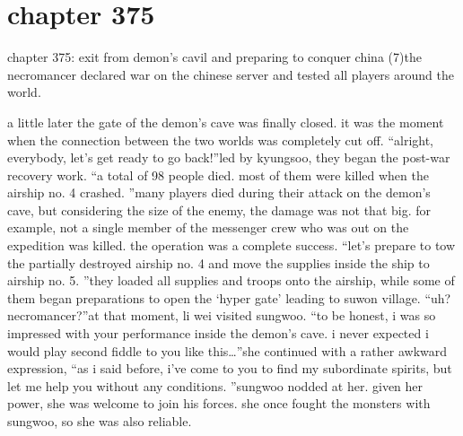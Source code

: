 \section{chapter 375}

chapter 375: exit from demon’s cavil and preparing to conquer china (7)the necromancer declared war on the chinese server and tested all players around the world.





a little later the gate of the demon’s cave was finally closed.
 it was the moment when the connection between the two worlds was completely cut off.
“alright, everybody, let’s get ready to go back!”led by kyungsoo, they began the post-war recovery work.
“a total of 98 people died.
 most of them were killed when the airship no.
 4 crashed.
”many players died during their attack on the demon’s cave, but considering the size of the enemy, the damage was not that big.
 for example, not a single member of the messenger crew who was out on the expedition was killed.
 the operation was a complete success.
“let’s prepare to tow the partially destroyed airship no.
 4 and move the supplies inside the ship to airship no.
 5.
”they loaded all supplies and troops onto the airship, while some of them began preparations to open the ‘hyper gate’ leading to suwon village.
“uh? necromancer?”at that moment, li wei visited sungwoo.
“to be honest, i was so impressed with your performance inside the demon’s cave.
 i never expected i would play second fiddle to you like this…”she continued with a rather awkward expression, “as i said before, i’ve come to you to find my subordinate spirits, but let me help you without any conditions.
”sungwoo nodded at her.
 given her power, she was welcome to join his forces.
 she once fought the monsters with sungwoo, so she was also reliable.

